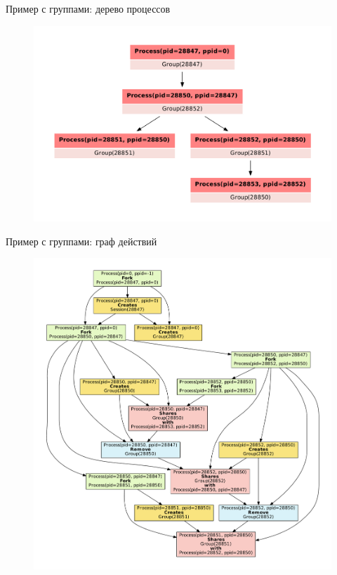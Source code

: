 \begin{frame}{Пример с группами: дерево процессов}
	\begin{figure}[ht!]
	\centering
	\includegraphics[width=\textwidth]{fig/groups-pstree.pdf}
	\end{figure}
\end{frame}

\begin{frame}{Пример с группами: граф действий}
	\begin{figure}[ht!]
	\centering
	\includegraphics[scale=0.23]{fig/exampleActGraph.pdf}
	\end{figure}
\end{frame}

